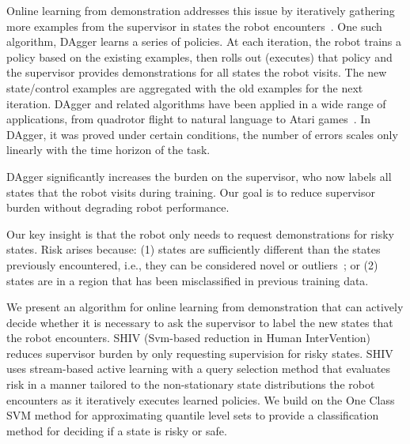 \documentclass[10pt, conference]{ieeeconf}      %
\newcommand{\adnote}[1]{\ifthenelse{ \boolean{include-notes}}%
 {\textcolor{blue}{\textbf{AD: #1}}}{}}
\begin{document}
Online learning from demonstration addresses this issue by iteratively gathering more examples from the supervisor in states the robot encounters~\cite{grollman2007dogged,ross2010efficient,ross2010reduction}. One such algorithm, DAgger learns a series of policies. At each iteration, the robot trains a policy based on the existing examples, then rolls out (executes) that policy and the supervisor provides demonstrations for all states the robot visits. The new state/control examples are aggregated with the old examples for the next iteration. DAgger and related algorithms have been applied in a wide range of applications, from quadrotor flight to natural language to Atari games~\cite{NIPS2014_5421,duvallet2013imitation,ross2013learning}. In DAgger, it was proved under certain conditions, the number of errors scales only linearly with the time horizon of the task.

DAgger significantly increases the burden on the supervisor, who now labels all states that the robot visits during training.  Our goal is to reduce supervisor burden without degrading robot performance.

Our key insight is that the robot only needs to request demonstrations for risky states. Risk arises because:  (1) states are sufficiently different than the states previously encountered, i.e., they can be considered novel or outliers~\cite{hodge2004survey}; or (2) states are in a region that has been misclassified in previous training data.


We present an algorithm for online learning from demonstration that can actively decide whether it is necessary to ask the supervisor to label the new states that the robot encounters. SHIV  (Svm-based reduction in Human InterVention) reduces supervisor burden by only requesting supervision for risky states. SHIV uses stream-based active learning with a query selection method that evaluates risk in a manner tailored to the non-stationary state distributions the robot encounters as it iteratively executes learned policies. We build on the One Class SVM method for approximating quantile level sets \cite{scholkopf2001estimating} to provide a classification method for deciding if a state is risky or safe.
\end{document}
